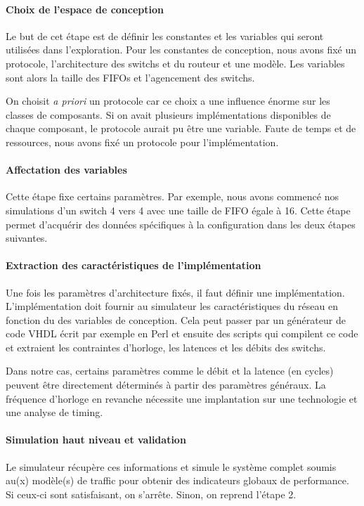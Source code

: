 \paragraph{Choix de l'espace de conception}
Le but de cet étape est de définir les constantes et les variables qui seront utilisées dans l'exploration. Pour les constantes de conception, nous avons fixé un protocole, l'architecture des switchs et du routeur et une modèle. Les variables sont alors la taille des FIFOs et l'agencement des switchs.

On choisit \textit{a priori} un protocole car ce choix a une influence énorme sur les classes de composants. Si on avait plusieurs implémentations disponibles de chaque composant, le protocole aurait pu être une variable. Faute de temps et de ressources, nous avons fixé un protocole pour l'implémentation.

\paragraph{Affectation des variables}
Cette étape fixe certains paramètres. Par exemple, nous avons commencé nos simulations d'un switch 4 vers 4 avec une taille de FIFO égale à 16. Cette étape permet d'acquérir des données spécifiques à la configuration dans les deux étapes suivantes.

\paragraph{Extraction des caractéristiques de l'implémentation}
Une fois les paramètres d'architecture fixés, il faut définir une implémentation. L'implémentation doit fournir au simulateur les caractéristiques du réseau en fonction du des variables de conception. Cela peut passer par un générateur de code VHDL écrit par exemple en Perl et ensuite des scripts qui compilent ce code et extraient les contraintes d'horloge, les latences et les débits des switchs.

Dans notre cas, certains paramètres comme le débit et la latence (en cycles) peuvent être directement déterminés à partir des paramètres généraux. La fréquence d'horloge en revanche nécessite une implantation sur une technologie et une analyse de timing.

\paragraph{Simulation haut niveau et validation}
Le simulateur récupère ces informations et simule le système complet soumis au(x) modèle(s) de traffic pour obtenir des indicateurs globaux de performance. Si ceux-ci sont satisfaisant, on s'arrête. Sinon, on reprend l'étape 2.

